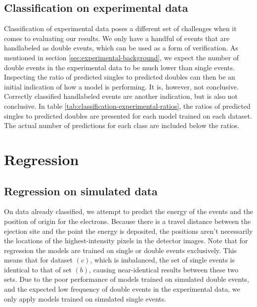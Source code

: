 \subsection{Classification on experimental data}
Classification of experimental data poses a different set of challenges when it comes
to evaluating our results. We only have a handful of events that are handlabeled as
double events, which can be used as a form of verification. As mentioned in section
\ref{sec:experimental-background}, we expect the number of double events in the experimental
data to be much lower than single events. Inspecting the ratio of predicted singles to predicted
doubles can then be an initial indication of how a model is performing. It is, however,
not conclusive. Correctly classified handlabeled events are another indication, but
is also not conclusive. In table \ref{tab:classification-experimental-ratios}, the ratios
of predicted singles to predicted doubles are presented for each model trained on each
dataset. The actual number of predictions for each class are included below the ratios.





 
\section{Regression}
\subsection{Regression on simulated data}
On data already classified, we attempt to predict the energy of the events and the 
position of origin for the electrons. Because there is a travel distance between the 
ejection site and the point the energy is deposited, the positions aren't necessarily
the locations of the highest-intensity pixels in the detector images.
Note that for regression the models are trained on single or double events exclusively.
This means that for dataset $(c)$, which is imbalanced, the set of single events is
identical to that of set $(b)$, causing near-identical results between these two sets.
Due to the poor performance of models trained on simulated double events, and the
expected low frequency of double events in the experimental data, we only apply models
trained on simulated single events.
